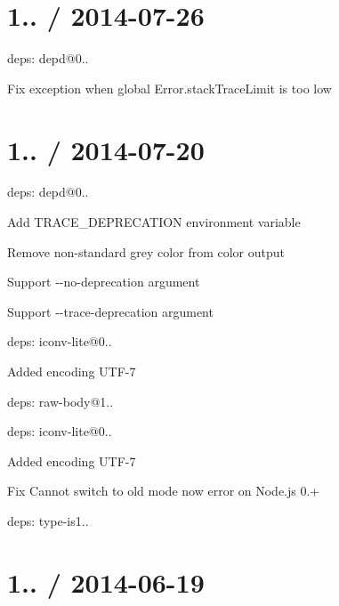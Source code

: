 \section*{1.. / 2014-\/07-\/26 }


\begin{DoxyItemize}
\item deps\+: depd@0..
\begin{DoxyItemize}
\item Fix exception when global {\ttfamily Error.\+stack\+Trace\+Limit} is too low
\end{DoxyItemize}
\end{DoxyItemize}

\section*{1.. / 2014-\/07-\/20 }


\begin{DoxyItemize}
\item deps\+: depd@0..
\begin{DoxyItemize}
\item Add {\ttfamily T\+R\+A\+C\+E\+\_\+\+D\+E\+P\+R\+E\+C\+A\+T\+I\+ON} environment variable
\item Remove non-\/standard grey color from color output
\item Support {\ttfamily -\/-\/no-\/deprecation} argument
\item Support {\ttfamily -\/-\/trace-\/deprecation} argument
\end{DoxyItemize}
\item deps\+: iconv-\/lite@0..
\begin{DoxyItemize}
\item Added encoding U\+T\+F-\/7
\end{DoxyItemize}
\item deps\+: raw-\/body@1..
\begin{DoxyItemize}
\item deps\+: iconv-\/lite@0..
\item Added encoding U\+T\+F-\/7
\item Fix {\ttfamily Cannot switch to old mode now} error on Node.\+js 0.+
\end{DoxyItemize}
\item deps\+: type-\/is1..
\end{DoxyItemize}

\section*{1.. / 2014-\/06-\/19 }


